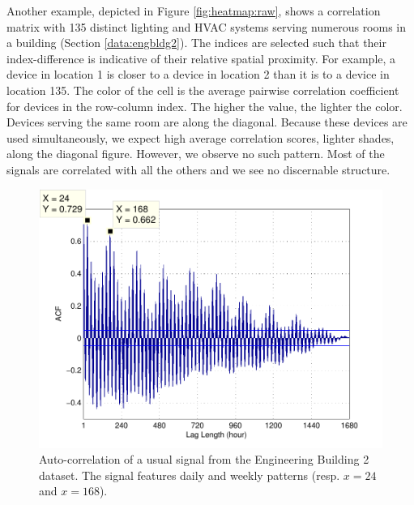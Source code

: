 Another example, depicted in Figure \ref{fig:heatmap:raw}, shows a correlation matrix with 135 distinct lighting and HVAC systems serving numerous rooms in a building (Section \ref{data:engbldg2}).
The indices are selected such that their index-difference is indicative of their relative spatial proximity.  
For example, a device in location 1 is closer to a device in location 2 than it is to 
a device in location 135. 
The color of the cell is the average pairwise correlation coefficient for devices in the row-column index.  The higher the value, the lighter the color.
Devices serving the same room are along the diagonal.  Because these devices are used simultaneously, we expect
high average correlation scores, lighter shades, along the diagonal figure.
However, we observe no such pattern.  %
Most of the signals are correlated with all the others and we see no discernable structure.

\begin{figure}[t!]
\begin{center}
\includegraphics[width=.45\textwidth]{img/acf_101A1_GHP-eps-converted-to.pdf}
\caption{Auto-correlation of a usual signal from the Engineering Building 2 dataset.
The signal features daily and weekly patterns (resp. $x=24$ and $x=168$).}
\label{fig:autocorr}
\end{center}
\end{figure}

